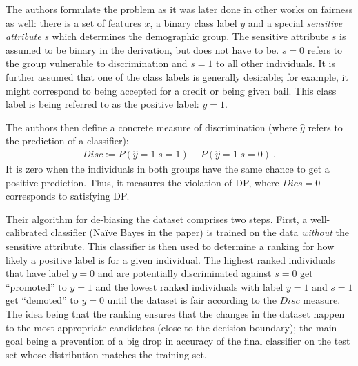 The authors formulate the problem as it was later done in other works on fairness as well:
there is a set of features \(x\), a binary class label \(y\)
and a special \emph{sensitive attribute} \(s\) which determines the demographic group.
The sensitive attribute \(s\) is assumed to be binary in the derivation,
but does not have to be.
\(s=0\) refers to the group vulnerable to discrimination and \(s=1\) to all other individuals.
It is further assumed that one of the class labels is generally desirable;
for example, it might correspond to being accepted for a credit or being given bail.
This class label is being referred to as the positive label: \(y = 1\).

The authors then define a concrete measure of discrimination (where $\hat{y}$ refers to the prediction of a classifier):
\begin{align}
  \label{eq:disc}
  Disc := P(\hat{y}=1|s =1) - P(\hat{y}=1|s = 0)~.
\end{align}
It is zero when the individuals in both groups have the same chance to get a positive prediction.
Thus, it measures the violation of \ac{DP}, where $Dics=0$ corresponds to satisfying \ac{DP}.

Their algorithm for de-biasing the dataset comprises two steps.
First, a well-calibrated classifier (Na\"ive Bayes in the paper) is trained on the data
\emph{without} the sensitive attribute.
This classifier is then used to determine a ranking for how likely a positive label is for a given individual.
The highest ranked individuals that have label \(y=0\)
and are potentially discriminated against \(s=0\) get ``promoted'' to \(y=1\)
and the lowest ranked individuals with label \(y=1\) and \(s=1\) get ``demoted'' to \(y=0\)
until the dataset is fair according to the \(Disc\) measure.
The idea being that the ranking ensures that the changes in the dataset
happen to the most appropriate candidates (close to the decision boundary);
the main goal being a prevention of a big drop in accuracy of the final classifier
on the test set whose distribution matches the training set.


